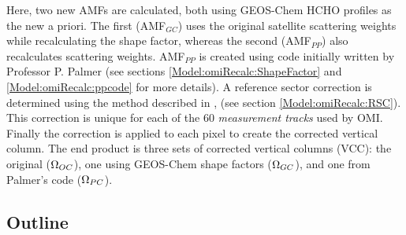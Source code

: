  Here, two new AMFs are calculated, both using GEOS-Chem HCHO profiles as the new a priori. 
  The first (AMF$_{GC}$) uses the original satellite scattering weights while recalculating the shape factor, whereas the second (AMF$_{PP}$) also recalculates scattering weights.
  AMF$_{PP}$ is created using code initially written by Professor P. Palmer (see sections \ref{Model:omiRecalc:ShapeFactor} and \ref{Model:omiRecalc:ppcode} for more details).
  A reference sector correction is determined using the method described in \textcite{Abad2016}, (see section \ref{Model:omiRecalc:RSC}).
  This correction is unique for each of the 60 \textit{measurement tracks} used by OMI.
  Finally the correction is applied to each pixel to create the corrected vertical column. 
  The end product is three sets of corrected vertical columns (VCC): the original ($\Omega_{OC}$), one using GEOS-Chem shape factors ($\Omega_{GC}$), and one from Palmer's code ($\Omega_{PC}$).
  
  \subsection{Outline}
    \label{Model:omiRecalc:outline}
    
